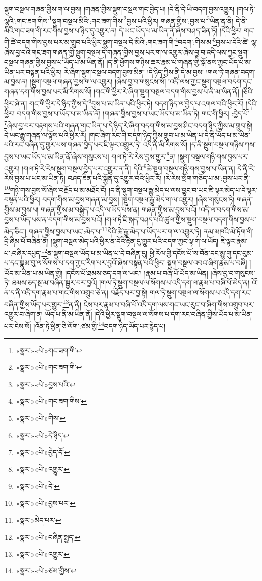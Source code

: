 སྡུག་བསྔལ་གཞན་གྱིས་ག་ལ་བྱས། །གཞན་གྱིས་སྡུག་བསྔལ་གང་བྱེད་པ། །དེ་ནི་དེ་ཡི་བདག་བྱས་འགྱུར། །གལ་ཏེ་ལྷའི་:གང་ཟག་གིས་\footnote{«སྣར་»«པེ་»གང་ཟག་གི་}སྡུག་བསྔལ་མིའི་:གང་ཟག་གིས་\footnote{«སྣར་»«པེ་»གང་ཟག་གི་}བྱས་པའི་ཕྱིར། གཞན་གྱིས་:བྱས་པ་\footnote{«སྣར་»«པེ་»བྱས་པའི་}ཡིན་ན་ནི། དེ་ནི་མིའི་གང་ཟག་གི་རང་གིས་བྱས་པ་ཉིད་དུ་འགྱུར་ན། དེ་ཡང་ཡོད་པ་མ་ཡིན་ནོ་ཞེས་བཤད་ཟིན་ཏོ། །དེའི་ཕྱིར། གང་གི་ཚེ་བདག་གིས་བྱས་པར་མ་གྲུབ་པའི་ཕྱིར་སྡུག་བསྔལ་དེ་མིའི་:གང་ཟག་གི་\footnote{«སྣར་»«པེ་»གང་ཟག་གིས་}བདག་:གིས་མ་\footnote{«སྣར་»«པེ་»གིས་}བྱས་པ་དེའི་ཚེ། ལྷ་ཞེས་བྱ་བའི་གང་ཟག་གཞན་གྱི་སྡུག་བསྔལ་དེ་གཞན་གྱིས་བྱས་པར་ག་ལ་འགྱུར་ཞེས་བྱ་བ་འདི་ལས་ཀྱང་སྡུག་བསྔལ་གཞན་གྱིས་བྱས་པ་ཡོད་པ་མ་ཡིན་ནོ། །ད་ནི་ཕྱོགས་གཉིས་ཆར་རྣམ་པ་གཞན་གྱི་སྒོ་ནས་ཀྱང་ཡོད་པ་མ་ཡིན་པར་བསྟན་པའི་ཕྱིར། རེ་ཞིག་སྡུག་བསྔལ་བདག་བྱས་མིན། །དེ་ཉིད་ཀྱིས་ནི་དེ་མ་བྱས། །གལ་ཏེ་གཞན་བདག་མ་བྱས་ན། །སྡུག་བསྔལ་གཞན་བྱས་ག་ལ་འགྱུར། །ཞེས་བྱ་བ་གསུངས་སོ། །འདི་ལས་ཀྱང་སྡུག་བསྔལ་བདག་དང་གཞན་དག་གིས་བྱས་པར་མི་རིགས་སོ། །གང་གི་ཕྱིར་རེ་ཞིག་སྡུག་བསྔལ་བདག་གིས་བྱས་པ་ནི་མ་ཡིན་ནོ། །ཅིའི་ཕྱིར་ཞེ་ན། གང་གི་ཕྱིར་དེ་ཉིད་ཀྱིས་དེ་\footnote{«སྣར་»«པེ་»དེ་ཉིད་}བྱས་པ་མ་ཡིན་པའི་ཕྱིར་ཏེ། བདག་ཉིད་ལ་བྱེད་པ་འགལ་བའི་ཕྱིར་རོ། །དེའི་ཕྱིར། བདག་གིས་བྱས་པ་ཡོད་པ་མ་ཡིན་ནོ། །གཞན་གྱིས་བྱས་པ་ཡང་ཡོད་པ་མ་ཡིན་ཏེ། གང་གི་ཕྱིར། :བྱེད་པོ་\footnote{«སྣར་»«པེ་»བྱེད་དོ་}ཞེས་བྱ་བར་བརྟགས་པའི་གཞན་གང་ཡིན་པ་དེ་ཉིད་རེ་ཞིག་བདག་གིས་མ་བྱས་ཤིང་བདག་ཉིད་ཀྱིས་མ་གྲུབ་སྟེ། དེ་ཡང་རྒྱུ་གཞན་ལ་ལྟོས་པའི་ཕྱིར་རོ། །གང་ཞིག་རང་གི་བདག་ཉིད་ཀྱིས་གྲུབ་པ་མ་ཡིན་པ་དེ་ནི་ཡོད་པ་མ་ཡིན་པའི་རང་བཞིན་དུ་གྱུར་པས་གཞན་བྱེད་པར་ཇི་ལྟར་འགྱུར་ཏེ། འདི་ནི་མི་རིགས་སོ། །ད་ནི་སྡུག་བསྔལ་གཉིས་ཀས་བྱས་པ་ཡང་ཡོད་པ་མ་ཡིན་ནོ་ཞེས་གསུངས་པ། གལ་ཏེ་རེ་རེས་བྱས་གྱུར་\footnote{«སྣར་»«པེ་»འགྱུར་}ན། །སྡུག་བསྔལ་གཉི་གས་བྱས་པར་འགྱུར། །གལ་ཏེ་རེ་རེས་སྡུག་བསྔལ་བྱེད་པར་འགྱུར་ན་ནི། དེའི་\footnote{«སྣར་»«པེ་»དེ་}ཚེ་སྡུག་བསྔལ་གཉི་གས་བྱས་པ་ཡིན་ན། དེ་ནི་རེ་རེས་བྱས་པ་ཡང་མ་ཡིན་ཏེ། བཤད་ཟིན་པའི་སྐྱོན་དུ་འགྱུར་བའི་ཕྱིར་རོ། །རེ་རེས་སྲོག་གཅོད་པ་མ་:བྱས་པར་ནི་\footnote{«སྣར་»«པེ་»བྱས་པར་}གཉི་གས་བྱས་སོ་ཞེས་བརྗོད་པ་མ་མཐོང་ངོ། །ད་ནི་སྡུག་བསྔལ་རྒྱུ་མེད་པ་ལས་བྱུང་བ་ཡང་ཇི་ལྟར་མེད་པ་དེ་ལྟར་བསྟན་པའི་ཕྱིར། བདག་གིས་མ་བྱས་གཞན་མ་བྱས། །སྡུག་བསྔལ་རྒྱུ་མེད་ག་ལ་འགྱུར། །ཞེས་གསུངས་ཏེ། གཞན་གྱིས་མ་བྱས་པ། གཞན་གྱིས་མ་བསྐྱེད་པ་འདི་ལ་ཡོད་པས་ན། གཞན་གྱིས་མ་བྱས་པའོ། །འདི་ལ་བདག་གིས་མ་བྱས་པ་ཡོད་པས་ན་བདག་གིས་མ་བྱས་པའོ། །གལ་ཏེ་ཇི་སྐད་བཤད་པའི་ཚུལ་གྱིས་སྡུག་བསྔལ་བདག་གིས་བྱས་པ་མེད་ཅིང་། གཞན་གྱིས་བྱས་པ་ཡང་:མེད་པ་\footnote{«སྣར་»མེད་པར་}དེའི་ཚེ་རྒྱུ་མེད་པ་ཡོད་པར་ག་ལ་འགྱུར་ཏེ། ནམ་མཁའི་མེ་ཏོག་གི་དྲི་ཞིམ་པོ་བཞིན་ནོ། །སྡུག་བསྔལ་མེད་པའི་ཕྱིར་ན་དེའི་རྟེན་དུ་གྱུར་པའི་བདག་ཀྱང་ལྟ་ག་ལ་ཡོད། ཇི་ལྟར་རྣམ་པ་:བཞིར་དཔྱད་\footnote{«སྣར་»«པེ་»བཞིན་སྤྱད་}ན་སྡུག་བསྔལ་ཡོད་པ་མ་ཡིན་པ་དེ་བཞིན་དུ། ཕྱི་རོལ་གྱི་དངོས་པོ་ས་བོན་དང་མྱུ་གུ་དང་བུམ་པ་དང་སྣམ་བུ་ལ་སོགས་པ་དག་ཀྱང་རིག་པར་བྱའོ་ཞེས་བསྟན་པའི་ཕྱིར། སྡུག་བསྔལ་འབའ་ཞིག་རྣམ་པ་བཞི། །ཡོད་མ་ཡིན་པ་མ་ཡིན་གྱི། །དངོས་པོ་ཐམས་ཅད་དག་ལ་ཡང་། །རྣམ་པ་བཞི་པོ་ཡོད་མ་ཡིན། །ཞེས་བྱ་བ་གསུངས་ཏེ། ཐམས་ཅད་སྔ་མ་བཞིན་སྦྱར་བར་བྱའོ། །གལ་ཏེ་སྡུག་བསྔལ་ལ་སོགས་པ་འདི་དག་ལ་རྣམ་པ་བཞི་པོ་མེད་ན། འོ་ན་ད་ནི་འདི་དག་རྣམ་པ་གང་གིས་འགྲུབ་ཅེ་ན། བརྗོད་པར་བྱ་སྟེ། གལ་ཏེ་སྡུག་བསྔལ་ལ་སོགས་པ་འདི་དག་རང་བཞིན་གྱིས་ཡོད་པར་གྱུར་\footnote{«སྣར་»«པེ་»འགྱུར་}ན་ནི། ངེས་པར་རྣམ་པ་བཞི་པོ་འདི་དག་ལས་གང་ཡང་རུང་བ་ཞིག་གིས་འགྲུབ་པར་འགྱུར་བ་ཞིག་ན། ཡོད་པ་ནི་མ་ཡིན་ནོ། །དེའི་ཕྱིར་སྡུག་བསྔལ་ལ་སོགས་པ་དག་རང་བཞིན་གྱིས་ཡོད་པ་མ་ཡིན་པར་ངེས་སོ། །འོན་ཏེ་ཕྱིན་ཅི་ལོག་:ཙམ་གྱི་\footnote{«སྣར་»«པེ་»ཙམ་གྱིས་}བདག་ཉིད་ཡོད་པར་རྙེད་པ། 